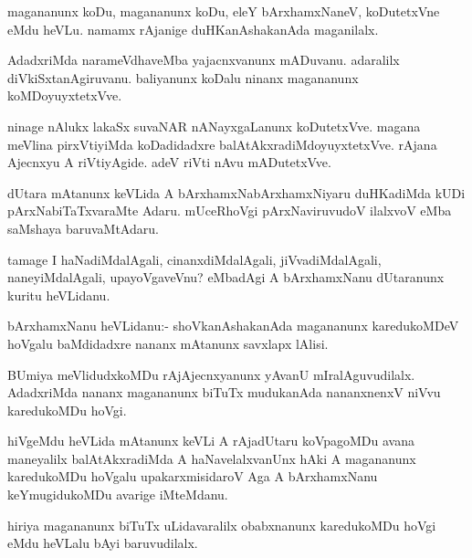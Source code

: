 \begin{mng}
magananunx koDu, magananunx koDu, eleY bArxhamxNaneV, koDutetxVne eMdu heVLu. namamx rAjanige duHKanAshakanAda maganilalx.
\end{mng}

\begin{mng}
AdadxriMda narameVdhaveMba yajacnxvanunx mADuvanu. adaralilx diVkiSxtanAgiruvanu. baliyanunx koDalu ninanx magananunx koMDoyuyxtetxVve.
\end{mng}

\begin{mng}
ninage nAlukx lakaSx suvaNAR nANayxgaLanunx koDutetxVve. magana meVlina pirxVtiyiMda koDadidadxre balAtAkxradiMdoyuyxtetxVve. rAjana Ajecnxyu A riVtiyAgide. adeV riVti nAvu mADutetxVve.
\end{mng}

\begin{mng}
dUtara mAtanunx keVLida A bArxhamxNabArxhamxNiyaru duHKadiMda kUDi pArxNabiTaTxvaraMte Adaru. mUceRhoVgi pArxNaviruvudoV ilalxvoV eMba saMshaya baruvaMtAdaru.
\end{mng}

\begin{mng}
tamage I haNadiMdalAgali, cinanxdiMdalAgali, jiVvadiMdalAgali, naneyiMdalAgali, upayoVgaveVnu? eMbadAgi A bArxhamxNanu dUtaranunx kuritu heVLidanu.
\end{mng}

\begin{mng}
bArxhamxNanu heVLidanu:- shoVkanAshakanAda magananunx karedukoMDeV hoVgalu baMdidadxre nananx mAtanunx savxlapx lAlisi.
\end{mng}

\begin{mng}
BUmiya meVlidudxkoMDu rAjAjecnxyanunx yAvanU mIralAguvudilalx. AdadxriMda nananx magananunx biTuTx mudukanAda nananxnenxV niVvu karedukoMDu hoVgi.
\end{mng}

\begin{mng}
hiVgeMdu heVLida mAtanunx keVLi A rAjadUtaru koVpagoMDu avana maneyalilx balAtAkxradiMda A haNavelalxvanUnx hAki A magananunx karedukoMDu hoVgalu upakarxmisidaroV Aga A bArxhamxNanu keYmugidukoMDu avarige iMteMdanu.
\end{mng}

\begin{mng}
hiriya magananunx biTuTx uLidavaralilx obabxnanunx karedukoMDu hoVgi eMdu heVLalu bAyi baruvudilalx.
\end{mng}

